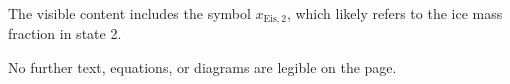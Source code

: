 The visible content includes the symbol \( x_{\text{Eis},2} \), which likely refers to the ice mass fraction in state 2.  

No further text, equations, or diagrams are legible on the page.